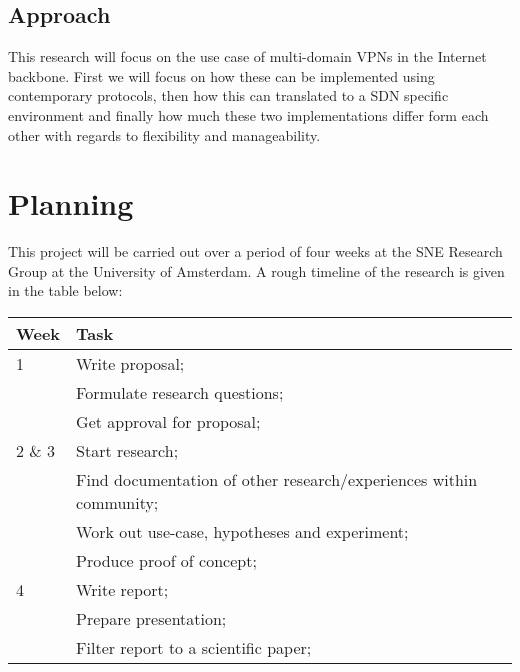 \documentclass[oneside,twocolumn,7pt,a4paper]{article}
\begin{document}
		\subsection*{Approach} %
		\label{sub:approach}
		This research will focus on the use case of multi-domain VPNs in the Internet backbone. First we will focus on how these can be implemented using contemporary protocols, then how this can translated to a SDN specific environment and finally how much these two implementations differ form each other with regards to flexibility and manageability.


	
	\section{Planning} %
	\label{sec:planning}
		This project will be carried out over a period of four weeks at the SNE Research Group at the University of Amsterdam. A rough timeline of the research is given in the table below: \\
		
		\begin{tabular}{l p{5.8cm}}
			Week & Task \\ \hline
				1 & Write proposal;\\
					& Formulate research questions; \\
					& Get approval for proposal; \\ \hline
				2 \& 3 & Start research; \\ 
					& Find documentation of other research/experiences within community; \\
					& Work out use-case, hypotheses and experiment; \\
				 	& Produce proof of concept; \\  \hline
				4 & Write report; \\ 
					& Prepare presentation; \\
					& Filter report to a scientific paper; \\
		\end{tabular}
		
\end{document}

